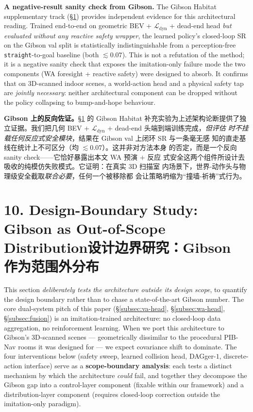 \documentclass[11pt,a4paper]{article}
\newcommand{\en}[1]{\par\noindent #1\par\vspace{0.15em}}
\newcommand{\zh}[1]{\par\noindent\color{zhcol}\hspace{0.5em}#1\par\color{black}\vspace{0.6em}}
\newcommand{\bisec}[2]{\section[#1]{#1\quad\normalfont\small\color{zhcol}\textsf{#2}}}
\begin{document}
\en{\textbf{A negative-result sanity check from Gibson.} The Gibson
Habitat supplementary track (\S\ref{sec:future}) provides independent
evidence for this architectural reading. Trained end-to-end on geometric
BEV + $\mathcal{L}_{\mathrm{dyn}}$ + dead-end head \emph{but evaluated
without any reactive safety wrapper}, the learned policy's closed-loop
SR on the Gibson val split is statistically indistinguishable from a
perception-free \texttt{straight}-to-goal baseline (both $\lesssim 0.07$).
This is not a refutation of the method; it is a negative sanity check
that exposes the imitation-only failure mode the two components
(WA foresight + reactive safety) were designed to absorb.  It confirms
that on 3D-scanned indoor scenes, a world-action head and a physical
safety tap are \emph{jointly necessary}: neither architectural component
can be dropped without the policy collapsing to bump-and-hope behaviour.}

\zh{\textsf{\textbf{Gibson 上的反向佐证。}\S\ref{sec:future} 的 Gibson
Habitat 补充实验为上述架构论断提供了独立证据。我们把几何 BEV $+$
$\mathcal{L}_{\mathrm{dyn}}$ $+$ dead-end 头端到端训练完成，\emph{但评估
时不挂载任何反应式安全模块}，结果在 Gibson val 上闭环 SR 与一条毫无感
知的直走基线在统计上不可区分（均 $\lesssim 0.07$）。这并非对方法本身
的否定，而是一个反向 sanity check——它恰好暴露出本文 WA 预演 $+$ 反应
式安全这两个组件所设计去吸收的纯模仿失败模式。它证明：在真实 3D 扫描室
内场景下，世界-动作头与物理级安全截取\emph{联合必要}，任何一个被移除都
会让策略坍缩为“撞墙-祈祷”式行为。}}

\bisec{10. Design-Boundary Study: Gibson as Out-of-Scope Distribution}
{设计边界研究：Gibson 作为范围外分布}\label{sec:future}

\en{This section \emph{deliberately tests the architecture outside its
design scope}, to quantify the design boundary rather than to chase a
state-of-the-art Gibson number. The core dual-system pitch of this
paper (\S\ref{subsec:va-head}, \S\ref{subsec:wa-head},
\S\ref{subsec:fusion}) is an imitation-trained architecture: no
closed-loop data aggregation, no reinforcement learning. When we port
this architecture to Gibson's 3D-scanned scenes — geometrically
dissimilar to the procedural PIB-Nav rooms it was designed for — we
expect covariance shift to dominate. The four interventions below
(safety sweep, learned collision head, DAGger-$1$, discrete-action
interface) serve as a \textbf{scope-boundary analysis}: each tests a
distinct mechanism by which the architecture \emph{could} fail, and
together they decompose the Gibson gap into a control-layer
component (fixable within our framework) and a
distribution-layer component (requires closed-loop correction outside
the imitation-only paradigm).}
\end{document}
